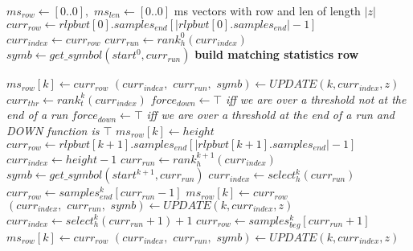 \begin{algorithm}
  \scriptsize
  \begin{algorithmic}[1]
    \State $ms_{row}\gets [0..0],\,\,ms_{len}\gets [0..0]$
    \Comment ms vectors with row and len of length $|z|$
    \State $curr_{row}\gets
    rlpbwt[0].samples_{end}[|rlpbwt[0].samples_{end}|-1]$
    \State $curr_{index}\gets curr_{row}$
    \State $curr_{run}\gets rank_h^0(curr_{index})$
    \State $symb\gets get\_symbol(start^0, curr_{run})$
    \Comment \textbf{build matching statistics row}
    \For {\textit{every} $k\in[0, |z|)$}

    \State $ms_{row}[k]\gets curr_{row}$
     \State $(curr_{index},\,\,curr_{run},\,\,symb)\gets UPDATE(k, curr_{index},
    z)$ 
    \EndIf
    \Else
    \State $curr_{thr}\gets rank_t^k(curr_{index})$
    \State $force_{down} \gets \top$\textit{ iff we are over a threshold not at
    the end of a run}
     \State $force_{down} \gets \top$\textit{ iff we are over a threshold at
    the end of a run and DOWN function is $\top$}
    \State $ms_{row}[k]\gets height$
    \State $curr_{row}\gets
    rlpbwt[k+1].samples_{end}[|rlpbwt[k+1].samples_{end}|-1]$
    \State $curr_{index}\gets height-1$
    \State $curr_{run}\gets rank_h^{k+1}(curr_{index})$
    \State $symb\gets get\_symbol(start^{k+1}, curr_{run})$
    \EndIf
    \State $curr_{index}\gets select_h^{k}(curr_{run})$
    \State $curr_{row}\gets samples_{end}^k[curr_{run}-1]$
    \State $ms_{row}[k]\gets curr_{row}$
     \State $(curr_{index},\,\,curr_{run},\,\,symb)\gets UPDATE(k, curr_{index},
    z)$ 
    \EndIf
    \Else
    \State $curr_{index}\gets select_h^{k}(curr_{run}+1)+1$
    \State $curr_{row}\gets samples_{beg}^k[curr_{run}+1]$
    \State $ms_{row}[k]\gets curr_{row}$
     \State $(curr_{index},\,\,curr_{run},\,\,symb)\gets UPDATE(k, curr_{index},
    z)$ 
    \EndIf
    \EndIf
    

\end{algorithmic}
\end{algorithm}
